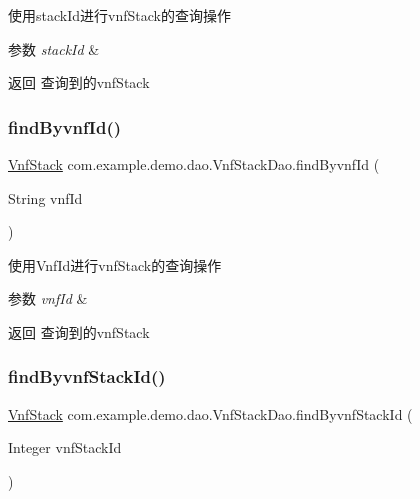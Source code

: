 使用stack\+Id进行vnf\+Stack的查询操作 
\begin{DoxyParams}{参数}
{\em stack\+Id} & \\
\hline
\end{DoxyParams}
\begin{DoxyReturn}{返回}
查询到的vnf\+Stack 
\end{DoxyReturn}
\mbox{\label{interfacecom_1_1example_1_1demo_1_1dao_1_1_vnf_stack_dao_aa337cbbfe5b310b0330aa79c1eecc9e3}} 
\subsubsection{\texorpdfstring{find\+Byvnf\+Id()}{findByvnfId()}}
{\footnotesize\ttfamily \mbox{\hyperlink{classcom_1_1example_1_1demo_1_1modular_1_1_vnf_stack}{Vnf\+Stack}} com.\+example.\+demo.\+dao.\+Vnf\+Stack\+Dao.\+find\+Byvnf\+Id (\begin{DoxyParamCaption}\item[{String}]{vnf\+Id }\end{DoxyParamCaption})}

使用\+Vnf\+Id进行vnf\+Stack的查询操作 
\begin{DoxyParams}{参数}
{\em vnf\+Id} & \\
\hline
\end{DoxyParams}
\begin{DoxyReturn}{返回}
查询到的vnf\+Stack 
\end{DoxyReturn}
\mbox{\label{interfacecom_1_1example_1_1demo_1_1dao_1_1_vnf_stack_dao_aad5b56c93516fbcf0a29343634594949}} 
\subsubsection{\texorpdfstring{find\+Byvnf\+Stack\+Id()}{findByvnfStackId()}}
{\footnotesize\ttfamily \mbox{\hyperlink{classcom_1_1example_1_1demo_1_1modular_1_1_vnf_stack}{Vnf\+Stack}} com.\+example.\+demo.\+dao.\+Vnf\+Stack\+Dao.\+find\+Byvnf\+Stack\+Id (\begin{DoxyParamCaption}\item[{Integer}]{vnf\+Stack\+Id }\end{DoxyParamCaption})}

